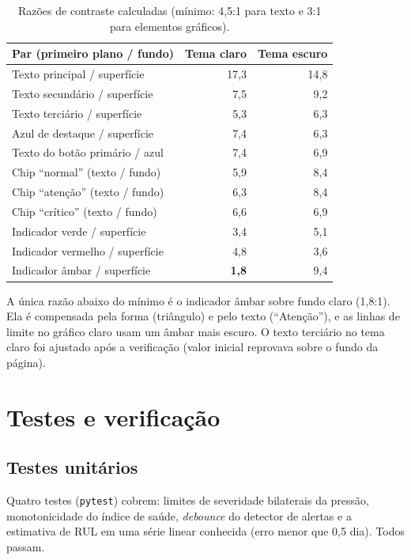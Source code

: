 \documentclass[12pt,a4paper]{article}
\newcommand{\codigo}[1]{\texttt{\small #1}}
\begin{document}
\begin{table}[H]
\centering
\caption{Razões de contraste calculadas (mínimo: 4,5:1 para texto e 3:1 para elementos gráficos).}
\label{tab:contraste}
\small
\begin{tabular}{@{}l r r@{}}
\toprule
\textbf{Par (primeiro plano / fundo)} & \textbf{Tema claro} & \textbf{Tema escuro}\\
\midrule
Texto principal / superfície & 17,3 & 14,8\\
Texto secundário / superfície & 7,5 & 9,2\\
Texto terciário / superfície & 5,3 & 6,3\\
Azul de destaque / superfície & 7,4 & 6,3\\
Texto do botão primário / azul & 7,4 & 6,9\\
Chip ``normal'' (texto / fundo) & 5,9 & 8,4\\
Chip ``atenção'' (texto / fundo) & 6,3 & 8,4\\
Chip ``crítico'' (texto / fundo) & 6,6 & 6,9\\
Indicador verde / superfície & 3,4 & 5,1\\
Indicador vermelho / superfície & 4,8 & 3,6\\
Indicador âmbar / superfície & \textbf{1,8} & 9,4\\
\bottomrule
\end{tabular}
\end{table}

A única razão abaixo do mínimo é o indicador âmbar sobre fundo claro (1,8:1). Ela é compensada pela forma (triângulo) e pelo texto (``Atenção''), e as linhas
de limite no gráfico claro usam um âmbar mais escuro. O texto terciário no tema claro foi ajustado após a verificação (valor inicial reprovava sobre o
fundo da página).

\section{Testes e verificação}
\label{sec:testes}
\subsection{Testes unitários}
Quatro testes (\codigo{pytest}) cobrem: limites de severidade bilaterais da pressão, monotonicidade do índice de saúde, \emph{debounce} do detector de alertas e a
estimativa de RUL em uma série linear conhecida (erro menor que 0,5 dia). Todos passam.
\end{document}
